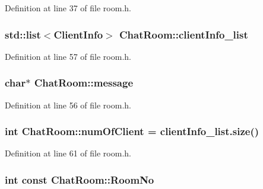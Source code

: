 Definition at line 37 of file room.\+h.

\subsubsection[{\texorpdfstring{client\+Info\+\_\+list}{clientInfo_list}}]{\setlength{\rightskip}{0pt plus 5cm}std\+::list$<${\bf Client\+Info}$>$ Chat\+Room\+::client\+Info\+\_\+list\hspace{0.3cm}{\ttfamily [private]}}\hypertarget{class_chat_room_a5345e005419e7f95c25b77136936f5e8}{}\label{class_chat_room_a5345e005419e7f95c25b77136936f5e8}


Definition at line 57 of file room.\+h.

\subsubsection[{\texorpdfstring{message}{message}}]{\setlength{\rightskip}{0pt plus 5cm}char$\ast$ Chat\+Room\+::message\hspace{0.3cm}{\ttfamily [private]}}\hypertarget{class_chat_room_a5bed055c0efb5c1686f9b2f8d0d6e872}{}\label{class_chat_room_a5bed055c0efb5c1686f9b2f8d0d6e872}


Definition at line 56 of file room.\+h.

\subsubsection[{\texorpdfstring{num\+Of\+Client}{numOfClient}}]{\setlength{\rightskip}{0pt plus 5cm}int Chat\+Room\+::num\+Of\+Client = client\+Info\+\_\+list.\+size()\hspace{0.3cm}{\ttfamily [private]}}\hypertarget{class_chat_room_a69ff25739f7ce8703f48f47fc3c7172d}{}\label{class_chat_room_a69ff25739f7ce8703f48f47fc3c7172d}


Definition at line 61 of file room.\+h.

\subsubsection[{\texorpdfstring{Room\+No}{RoomNo}}]{\setlength{\rightskip}{0pt plus 5cm}int const Chat\+Room\+::\+Room\+No\hspace{0.3cm}{\ttfamily [private]}}\hypertarget{class_chat_room_a505faca8089f97a821373d10dcb6b5a5}{}\label{class_chat_room_a505faca8089f97a821373d10dcb6b5a5}



